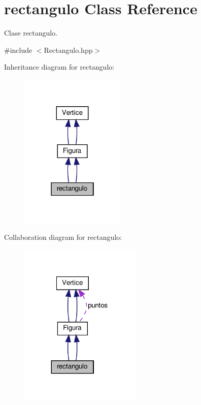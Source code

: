 \hypertarget{classrectangulo}{}\section{rectangulo Class Reference}
\label{classrectangulo}


Clase rectangulo.  




{\ttfamily \#include $<$Rectangulo.\+hpp$>$}



Inheritance diagram for rectangulo\+:
\nopagebreak
\begin{figure}[H]
\begin{center}
\leavevmode
\includegraphics[width=142pt]{classrectangulo__inherit__graph}
\end{center}
\end{figure}


Collaboration diagram for rectangulo\+:
\nopagebreak
\begin{figure}[H]
\begin{center}
\leavevmode
\includegraphics[width=164pt]{classrectangulo__coll__graph}
\end{center}
\end{figure}

